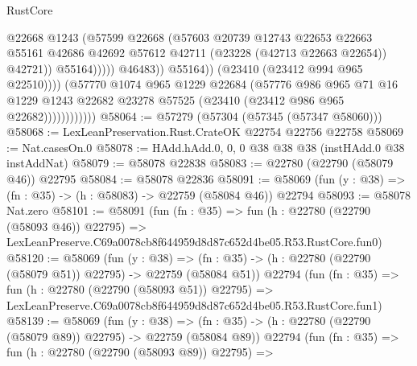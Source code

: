 \begin{lexlean}{RustCore}
\begin{coremodule}
                                          @22668
                                          @1243
                                          (@57599
                                            @22668
                                            (@57603
                                              @20739
                                              @12743
                                              @22653
                                              @22663
                                              @55161
                                              @42686
                                              @42692
                                              @57612
                                              @42711
                                              (@23228 (@42713 @22663 @22654))
                                              @42721))
                                          @55164)))))
                                @46483))
                            @55164))
                        (@23410 (@23412 @994 @965 @22510))))
                    (@57770
                      @1074
                      @965
                      @1229
                      @22684
                      (@57776
                        @986
                        @965
                        @71
                        @16
                        @1229
                        @1243
                        @22682
                        @23278
                        @57525
                        (@23410 (@23412 @986 @965 @22682))))))))))))
@58064 := @57279 (@57304 (@57345 (@57347 @58060)))
@58068 := LexLeanPreservation.Rust.CrateOK @22754 @22756 @22758
@58069 := Nat.casesOn.{0}
@58078 := HAdd.hAdd.{0, 0, 0} @38 @38 @38 (instHAdd.{0} @38 instAddNat)
@58079 := @58078 @22838
@58083 := @22780 (@22790 (@58079 @46)) @22795
@58084 := @58078 @22836
@58091 := @58069 (fun (y : @38) => (fn : @35) -> (h : @58083) -> @22759 (@58084 @46)) @22794
@58093 := @58078 Nat.zero
@58101 := @58091
    (fun (fn : @35) =>
    fun (h : @22780 (@22790 (@58093 @46)) @22795) =>
    LexLeanPreserve.C69a0078cb8f644959d8d87c652d4be05.R53.RustCore.fun0)
@58120 := @58069
    (fun (y : @38) =>
    (fn : @35) -> (h : @22780 (@22790 (@58079 @51)) @22795) -> @22759 (@58084 @51))
    @22794
    (fun (fn : @35) =>
    fun (h : @22780 (@22790 (@58093 @51)) @22795) =>
    LexLeanPreserve.C69a0078cb8f644959d8d87c652d4be05.R53.RustCore.fun1)
@58139 := @58069
    (fun (y : @38) =>
    (fn : @35) -> (h : @22780 (@22790 (@58079 @89)) @22795) -> @22759 (@58084 @89))
    @22794
    (fun (fn : @35) =>
    fun (h : @22780 (@22790 (@58093 @89)) @22795) =>

\end{coremodule}
\end{lexlean}
